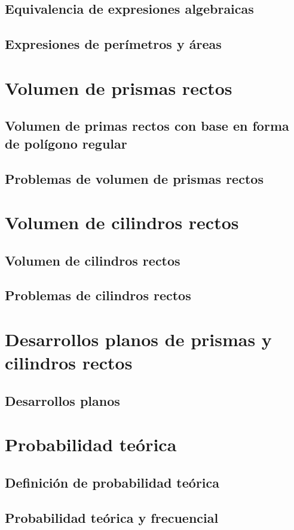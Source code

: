 \documentclass[11pt]{book}
\begin{document}
\subsection{Equivalencia de expresiones algebraicas}
\subsection{Expresiones de perímetros y áreas}

\section{Volumen de prismas rectos}
\subsection{Volumen de primas rectos con base en forma de polígono regular}
\subsection{Problemas de volumen de prismas rectos}

\section{Volumen de cilindros rectos}
\subsection{Volumen de cilindros rectos}
\subsection{Problemas de cilindros rectos}

\section{Desarrollos planos de prismas y cilindros rectos}
\subsection{Desarrollos planos}

\section{Probabilidad teórica}
\subsection{Definición de probabilidad teórica}
\subsection{Probabilidad teórica y frecuencial}
\end{document}
